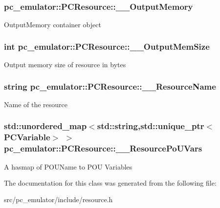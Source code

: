 \subsubsection[{\texorpdfstring{\+\_\+\+\_\+\+Output\+Memory}{__OutputMemory}}]{ pc\+\_\+emulator\+::\+P\+C\+Resource\+::\+\_\+\+\_\+\+Output\+Memory}\hypertarget{classpc__emulator_1_1PCResource_aa70b08417c498d378158b048915ff8c0}{}\label{classpc__emulator_1_1PCResource_aa70b08417c498d378158b048915ff8c0}
Output\+Memory container object 
\subsubsection[{\texorpdfstring{\+\_\+\+\_\+\+Output\+Mem\+Size}{__OutputMemSize}}]{\setlength{\rightskip}{0pt plus 5cm}int pc\+\_\+emulator\+::\+P\+C\+Resource\+::\+\_\+\+\_\+\+Output\+Mem\+Size}\hypertarget{classpc__emulator_1_1PCResource_a9b24906c7b1fcaee0ce72018c75bae9f}{}\label{classpc__emulator_1_1PCResource_a9b24906c7b1fcaee0ce72018c75bae9f}
Output memory size of resource in bytes 
\subsubsection[{\texorpdfstring{\+\_\+\+\_\+\+Resource\+Name}{__ResourceName}}]{\setlength{\rightskip}{0pt plus 5cm}string pc\+\_\+emulator\+::\+P\+C\+Resource\+::\+\_\+\+\_\+\+Resource\+Name}\hypertarget{classpc__emulator_1_1PCResource_a2ef3a8a76df532cdb7d913ee83ff67c8}{}\label{classpc__emulator_1_1PCResource_a2ef3a8a76df532cdb7d913ee83ff67c8}
Name of the resource 
\subsubsection[{\texorpdfstring{\+\_\+\+\_\+\+Resource\+Po\+U\+Vars}{__ResourcePoUVars}}]{\setlength{\rightskip}{0pt plus 5cm}std\+::unordered\+\_\+map$<$std\+::string,std\+::unique\+\_\+ptr$<${\bf P\+C\+Variable}$>$ $>$ pc\+\_\+emulator\+::\+P\+C\+Resource\+::\+\_\+\+\_\+\+Resource\+Po\+U\+Vars}\hypertarget{classpc__emulator_1_1PCResource_aead21e358bfd79dd6344c34980d51d5c}{}\label{classpc__emulator_1_1PCResource_aead21e358bfd79dd6344c34980d51d5c}
A hasmap of P\+O\+U\+Name to P\+OU Variables 

The documentation for this class was generated from the following file\+:\begin{DoxyCompactItemize}
\item 
src/pc\+\_\+emulator/include/resource.\+h\end{DoxyCompactItemize}
